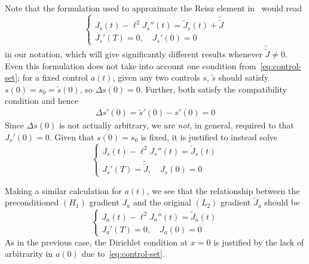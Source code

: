 \documentclass[letterpaper, 10pt, draft]{amsart}
\theoremstyle{definition}
\theoremstyle{remark}
\begin{document}
Note that the formulation used to approximate the Reisz element in~\cite{abdulla18} would read
\begin{equation*}
  \begin{cases}
    J_s(t) - \ell^2 J_s''(t) = \tilde{J}_s(t) + \tilde{\tilde{J}}
    \\
    J_s'(T) = 0,\quad
    J_s'(0) = 0
  \end{cases}
\end{equation*}
in our notation, which will give significantly different results whenever
$\tilde{\tilde{J}}\neq 0$.
Even this formulation does not take into account one condition
from~\eqref{eq:control-set}; for a fixed control $a(t)$, given any two controls
$s$, $\tilde{s}$ should satisfy $s(0)=s_0=\tilde{s}(0)$, so ${\Delta s}(0) = 0$.
Further, both satisfy the compatibility condition and hence
\begin{gather*}
  {\Delta s}'(0) = \tilde{s}'(0) - s'(0) = 0
\end{gather*}
Since ${\Delta s}(0)$ is not actually arbitrary, we are \emph{not}, in general,
required to that $J_s'(0)=0$.
Given that $s(0)=s_0$ is fixed, it is justified to instead solve
\begin{equation}
  \begin{cases}
  J_s(t) - \ell^2 J_s''(t) = \tilde{J}_s(t)
  \\
  J_s'(T) = \tilde{\tilde{J}},\quad
  J_s(0) = 0
\end{cases}\label{eq:gradient-s-precond}
\end{equation}

Making a similar calculation for $a(t)$, we see that the relationship between
the preconditioned $(H_1)$ gradient $J_a$ and the original $(L_2)$ gradient
$\tilde{J}_a$ should be
\begin{equation}
  \begin{cases}
  J_a(t) - \ell^2 J_a''(t) = \tilde{J}_a(t)\nonumber
  \\
  J_a'(T) = 0,\quad
  J_a(0) = 0
  \end{cases}\label{eq:gradient-a-precond}
\end{equation}
As in the previous case, the Dirichlet condition at $x=0$ is justified by the
lack of arbitrarity in $a(0)$ due to~\eqref{eq:control-set}.
\end{document}
